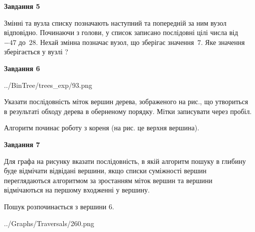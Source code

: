 \documentclass[12pt, ukrainian]{article}
\begin{document}
{\begin {large}
{\begin {center}\textbf{Завдання 5}\end {center}}\par
Змінні  та  вузла списку позначають наступний та попередній за ним вузол відповідно. Починаючи з голови, у список записано послідовні цілі числа від~$-47$ до~$28$. Нехай змінна  позначає вузол, що зберігає значення~$7$.
Яке значення зберігається у вузлі  ?\par
\newpage

{\begin {center}\textbf{Завдання 6}\end {center}}\par

\begin{center}
	{../BinTree/trees_exp/93.png}
\end{center}
Указати послідовність міток вершин дерева, зображеного на рис., що утвориться в результаті обходу дерева в оберненому порядку. Мітки записувати через пробіл.\par Алгоритм починає роботу з кореня (на рис. це верхня вершина).\par
\newpage

{\begin {center}\textbf{Завдання 7}\end {center}}\par
Для графа на рисунку вказати послідовність, в якій алгоритм пошуку в глибину буде відмічати відвідані вершини, якщо списки суміжності вершин переглядаються алгоритмом за зростанням міток вершин та вершини відмічаються на першому вход\-женні у вершину.\par
Пошук розпочинається з вершини 6.\par

\begin{center}
	{../Graphs/Traversals/260.png}
\end{center}\par
\newpage


\end{large}}
\end{document}
